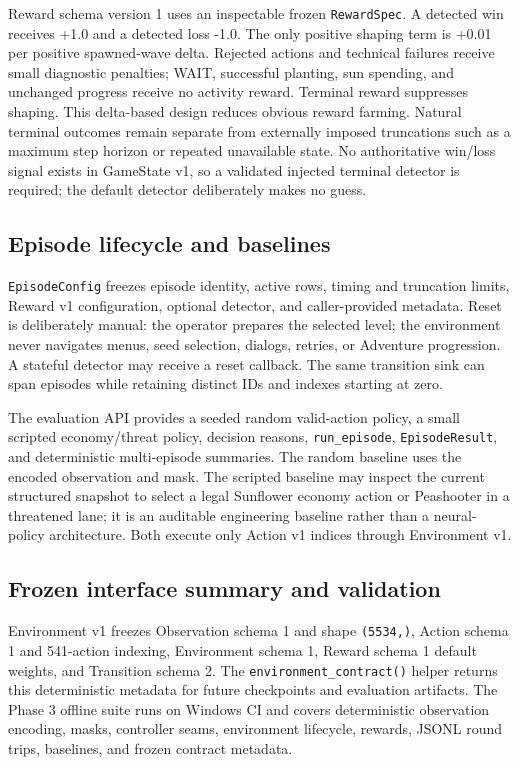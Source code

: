 \documentclass[11pt,a4paper]{article}
\begin{document}
Reward schema version 1 uses an inspectable frozen \texttt{RewardSpec}. A detected win receives +1.0 and a detected loss -1.0. The only positive shaping term is +0.01 per positive spawned-wave delta. Rejected actions and technical failures receive small diagnostic penalties; WAIT, successful planting, sun spending, and unchanged progress receive no activity reward. Terminal reward suppresses shaping. This delta-based design reduces obvious reward farming. Natural terminal outcomes remain separate from externally imposed truncations such as a maximum step horizon or repeated unavailable state. No authoritative win/loss signal exists in GameState v1, so a validated injected terminal detector is required; the default detector deliberately makes no guess.

\subsection{Episode lifecycle and baselines}
\texttt{EpisodeConfig} freezes episode identity, active rows, timing and truncation limits, Reward v1 configuration, optional detector, and caller-provided metadata. Reset is deliberately manual: the operator prepares the selected level; the environment never navigates menus, seed selection, dialogs, retries, or Adventure progression. A stateful detector may receive a reset callback. The same transition sink can span episodes while retaining distinct IDs and indexes starting at zero.

The evaluation API provides a seeded random valid-action policy, a small scripted economy/threat policy, decision reasons, \texttt{run\_episode}, \texttt{EpisodeResult}, and deterministic multi-episode summaries. The random baseline uses the encoded observation and mask. The scripted baseline may inspect the current structured snapshot to select a legal Sunflower economy action or Peashooter in a threatened lane; it is an auditable engineering baseline rather than a neural-policy architecture. Both execute only Action v1 indices through Environment v1.

\subsection{Frozen interface summary and validation}
Environment v1 freezes Observation schema 1 and shape \texttt{(5534,)}, Action schema 1 and 541-action indexing, Environment schema 1, Reward schema 1 default weights, and Transition schema 2. The \texttt{environment\_contract()} helper returns this deterministic metadata for future checkpoints and evaluation artifacts. The Phase 3 offline suite runs on Windows CI and covers deterministic observation encoding, masks, controller seams, environment lifecycle, rewards, JSONL round trips, baselines, and frozen contract metadata.
\end{document}
